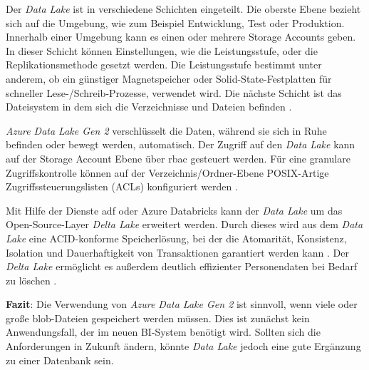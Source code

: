 Der \textit{Data Lake} ist in verschiedene Schichten eingeteilt. Die oberste Ebene bezieht sich auf die Umgebung, wie zum Beispiel Entwicklung, Test oder Produktion. Innerhalb einer Umgebung kann es einen oder mehrere Storage Accounts geben. In dieser Schicht können Einstellungen, wie die Leistungsstufe, oder die Replikationsmethode gesetzt werden. Die Leistungsstufe bestimmt unter anderem, ob ein günstiger Magnetspeicher oder Solid-State-Festplatten für schneller Lese-/Schreib-Prozesse, verwendet wird. Die nächste Schicht ist das Dateisystem in dem sich die Verzeichnisse und Dateien befinden \cite{lesteve_definitive_2021}.

\textit{Azure Data Lake Gen 2} verschlüsselt die Daten, während sie sich in Ruhe befinden oder bewegt werden, automatisch. Der Zugriff auf den \textit{Data Lake} kann auf der Storage Account Ebene über \ac{rbac} gesteuert werden. Für eine granulare Zugriffskontrolle können auf der Verzeichnis/Ordner-Ebene POSIX-Artige Zugriffssteuerungslisten (ACLs) konfiguriert werden \cite{lesteve_definitive_2021}.

Mit Hilfe der Dienste \ac{adf} oder Azure Databricks kann der \textit{Data Lake} um das Open-Source-Layer \textit{Delta Lake} erweitert werden. Durch dieses wird aus dem \textit{Data Lake} eine ACID-konforme Speicherlösung, bei der die Atomarität, Konsistenz, Isolation und Dauerhaftigkeit von Transaktionen garantiert werden kann \cite{lesteve_definitive_2021}. Der \textit{Delta Lake} ermöglicht es außerdem deutlich effizienter Personendaten bei Bedarf zu löschen \cite{brown_best_2021}.

\textbf{Fazit}: Die Verwendung von \textit{Azure Data Lake Gen 2} ist sinnvoll, wenn viele oder große \ac{blob}-Dateien gespeichert werden müssen. Dies ist zunächst kein Anwendungsfall, der im neuen BI-System benötigt wird. Sollten sich die Anforderungen in Zukunft ändern, könnte \textit{Data Lake} jedoch eine gute Ergänzung zu einer Datenbank sein.



